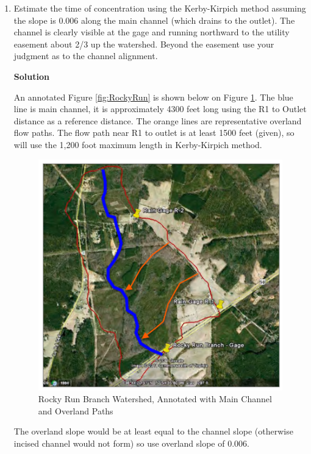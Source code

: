 \documentclass[12pt]{article}
\begin{document}
\begin{enumerate}
\item Estimate the time of concentration using the Kerby-Kirpich method assuming the slope is 0.006 along the main channel (which drains to the outlet).  The channel is clearly visible at the gage and running northward to the utility easement about 2/3 up the watershed.  Beyond the easement use your judgment as to the channel alignment. 

\textbf{Solution}

An annotated Figure \ref{fig:RockyRun} is shown below on Figure \ref{fig:RockyRunPaths}.  The blue line is main channel, it is approximately 4300 feet long using the R1 to Outlet distance as a reference distance.  The orange lines are representative overland flow paths. The flow path near R1 to outlet is at least 1500 feet (given), so will use the 1,200 foot maximum length in Kerby-Kirpich method.

\begin{figure}[h!] %
   \centering
   \includegraphics[width=5.0in]{RockyRunPaths.png} 
   \caption{Rocky Run Branch Watershed, Annotated with Main Channel and Overland Paths}
   \label{fig:RockyRunPaths}
\end{figure}

The overland slope would be at least equal to the channel slope (otherwise incised channel would not form) so use overland slope of 0.006. 


\end{enumerate}
\end{document}
